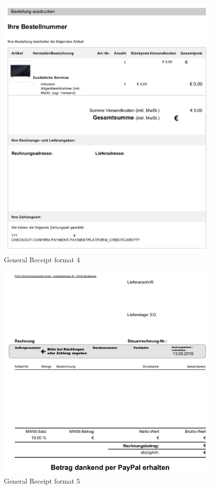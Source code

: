 \begin{figure}[H]
\centering
\includegraphics[scale=0.6]{images/GR-Formats/gs-format-4.png}
\caption{General Receipt format 4}
\label{ls_format2}
\end{figure}
\begin{figure}[H]
\centering
\includegraphics[scale=0.6]{images/GR-Formats/gs-format-5.png}
\caption{General Receipt format 5}
\label{ls_format2}
\end{figure}
